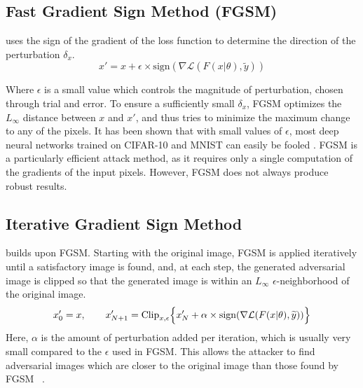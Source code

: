 \subsection{Fast Gradient Sign Method (FGSM)} 
\cite{Goodfellow2014ExplainingAH} uses the sign of the gradient of the loss function to determine the direction of the perturbation $\delta_x$. 
\[
    x' = x + \epsilon \times \text{sign}(\nabla \mathcal{L} (F(x|\theta),\widetilde{y}))
\]

Where $\epsilon$ is a small value which controls the magnitude of perturbation, chosen through trial and error.
To ensure a sufficiently small $\delta_x$, FGSM optimizes the $L_\infty$ distance between $x$ and $x'$, and thus tries to minimize the maximum change to any of the pixels.
It has been shown that with small values of $\epsilon$, most deep neural networks trained on CIFAR-10 and MNIST can easily be fooled \cite{Goodfellow2014ExplainingAH}.
FGSM is a particularly efficient attack method, as it requires only a single computation of the gradients of the input pixels.
However, FGSM does not always produce robust results.%

\subsection{Iterative Gradient Sign Method}
\cite{Kurakin2016AdversarialEI} builds upon FGSM.
Starting with the original image, FGSM is applied iteratively until a satisfactory image is found, and, at each step, the generated adversarial image is clipped so that the generated image is within an $L_\infty$ $\epsilon$-neighborhood of the original image.
\[
x_0' = x, \qquad x_{N+1}' = \text{Clip}_{x,\epsilon} \Bigl\{x_N' + \alpha \times \text{sign}(\nabla \mathcal{L} (F(x|\theta),\widetilde{y}))  \Bigr\} 
\]
Here, $\alpha$ is the amount of perturbation added per iteration, which is usually very small compared to the $\epsilon$ used in FGSM.
This allows the attacker to find adversarial images which are closer to the original image than those found by FGSM ~\cite{Kurakin2016AdversarialEI}.


